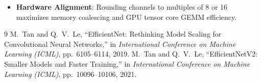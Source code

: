 \documentclass[11pt,a4paper]{article}
\theoremstyle{definition}
\begin{document}
\begin{itemize}
    \item \textbf{Hardware Alignment}: Rounding channels to multiples of 8 or 16 maximizes memory coalescing and GPU tensor core GEMM efficiency.
\end{itemize}

\begin{thebibliography}{9}
 M.~Tan and Q.~V.~Le, ``EfficientNet: Rethinking Model Scaling for Convolutional Neural Networks,'' in \emph{International Conference on Machine Learning (ICML)}, pp.~6105--6114, 2019.
 M.~Tan and Q.~V.~Le, ``EfficientNetV2: Smaller Models and Faster Training,'' in \emph{International Conference on Machine Learning (ICML)}, pp.~10096--10106, 2021.
\end{thebibliography}
\end{document}
